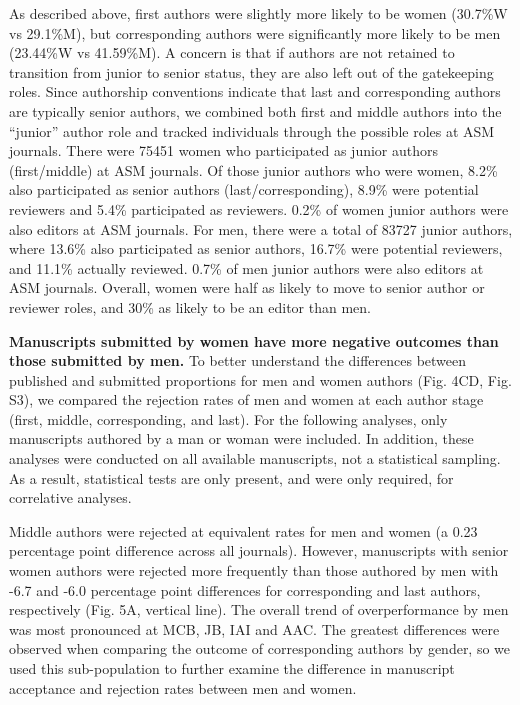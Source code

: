 \documentclass[11pt,]{article}
\begin{document}
As described above, first authors were slightly more likely to be women
(30.7\%W vs 29.1\%M), but corresponding authors were significantly more
likely to be men (23.44\%W vs 41.59\%M). A concern is that if authors
are not retained to transition from junior to senior status, they are
also left out of the gatekeeping roles. Since authorship conventions
indicate that last and corresponding authors are typically senior
authors, we combined both first and middle authors into the ``junior''
author role and tracked individuals through the possible roles at ASM
journals. There were 75451 women who participated as junior authors
(first/middle) at ASM journals. Of those junior authors who were women,
8.2\% also participated as senior authors (last/corresponding), 8.9\%
were potential reviewers and 5.4\% participated as reviewers. 0.2\% of
women junior authors were also editors at ASM journals. For men, there
were a total of 83727 junior authors, where 13.6\% also participated as
senior authors, 16.7\% were potential reviewers, and 11.1\% actually
reviewed. 0.7\% of men junior authors were also editors at ASM journals.
Overall, women were half as likely to move to senior author or reviewer
roles, and 30\% as likely to be an editor than men.

\textbf{Manuscripts submitted by women have more negative outcomes than
those submitted by men.} To better understand the differences between
published and submitted proportions for men and women authors (Fig. 4CD,
Fig. S3), we compared the rejection rates of men and women at each
author stage (first, middle, corresponding, and last). For the following
analyses, only manuscripts authored by a man or woman were included. In
addition, these analyses were conducted on all available manuscripts,
not a statistical sampling. As a result, statistical tests are only
present, and were only required, for correlative analyses.

Middle authors were rejected at equivalent rates for men and women (a
0.23 percentage point difference across all journals). However,
manuscripts with senior women authors were rejected more frequently than
those authored by men with -6.7 and -6.0 percentage point differences
for corresponding and last authors, respectively (Fig. 5A, vertical
line). The overall trend of overperformance by men was most pronounced
at MCB, JB, IAI and AAC. The greatest differences were observed when
comparing the outcome of corresponding authors by gender, so we used
this sub-population to further examine the difference in manuscript
acceptance and rejection rates between men and women.
\end{document}
